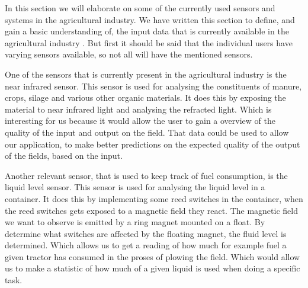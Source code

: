 
In this section we will elaborate on some of the currently used sensors and systems in the agricultural industry. We have written this section to define, and gain a basic understanding of, the input data that is currently available in the agricultural industry \cite{sensor:jd_sensors}. But first it should be said that the individual users have varying sensors available, so not all will have the mentioned sensors. \newline


One of the sensors that is currently present in the agricultural industry is the near infrared sensor. This sensor is used for analysing the constituents of manure, crops, silage and various other organic materials. It does this by exposing the material to near infrared light and analysing the refracted light\cite{sensor:manure-sensor}\cite{sensor:brochure}\cite{sensor:constituent}. \newline
Which is interesting for us because it would allow the user to gain a overview of the quality of the input and output on the field. That data could be used to allow our application, to make better predictions on the expected quality of the output of the fields, based on the input. \newline


Another relevant sensor, that is used to keep track of fuel consumption, is the  liquid level sensor. This sensor is used for analysing the liquid level in a container. It does this by implementing some reed switches in the container, when the reed switches gets exposed to a magnetic field they react. The magnetic field we want to observe is emitted by a ring magnet mounted on a float. By determine what switches are affected by the floating magnet, the fluid level is determined\cite{sensor:reedswitch}.\newline
Which allows us to get a reading of how much for example fuel a given tractor has consumed in the proses of plowing the field. Which would allow us to make a statistic of how much of a given liquid is used when doing a specific task. \newline


